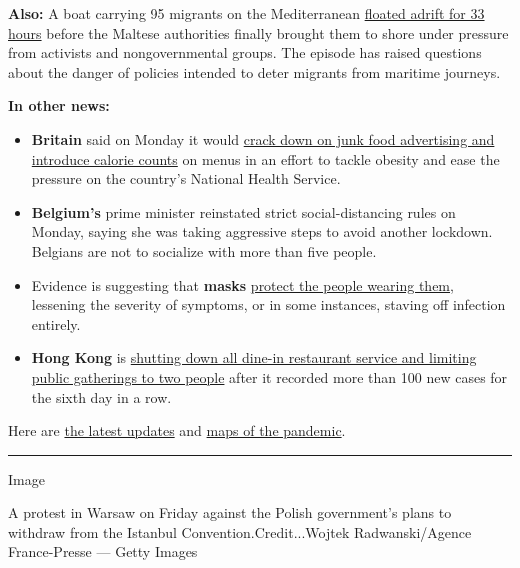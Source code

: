 \textbf{Also:} A boat carrying 95 migrants on the Mediterranean
\href{https://www.nytimes.com/2020/07/27/world/europe/migrant-boat-malta-stranded.html}{floated
adrift for 33 hours} before the Maltese authorities finally brought them
to shore under pressure from activists and nongovernmental groups. The
episode has raised questions about the danger of policies intended to
deter migrants from maritime journeys.

\textbf{In other news:}

\begin{itemize}
\item
  \textbf{Britain} said on Monday it would
  \href{https://www.nytimes.com/2020/07/27/world/europe/uk-boris-johnson-coronavirus-obesity.html}{crack
  down on junk food advertising and introduce calorie counts} on menus
  in an effort to tackle obesity and ease the pressure on the country's
  National Health Service.
\item
  \textbf{Belgium's} prime minister reinstated strict social-distancing
  rules on Monday, saying she was taking aggressive steps to avoid
  another lockdown. Belgians are not to socialize with more than five
  people.
\item
  Evidence is suggesting that \textbf{masks}
  \href{https://www.nytimes.com/2020/07/27/health/coronavirus-mask-protection.html}{protect
  the people wearing them}, lessening the severity of symptoms, or in
  some instances, staving off infection entirely.
\item
  \textbf{Hong Kong} is
  \href{https://www.nytimes.com/2020/07/27/world/coronavirus-covid-19.html?action=click\&pgtype=Article\&state=default\&module=styln-coronavirus-national\&region=TOP_BANNER\&context=storylines_menu\#link-4947ccd3}{shutting
  down all dine-in restaurant service and limiting public gatherings to
  two people} after it recorded more than 100 new cases for the sixth
  day in a row.
\end{itemize}

Here are
\href{https://www.nytimes.com/2020/07/27/world/coronavirus-covid-19.html}{the
latest updates} and
\href{https://www.nytimes.com/interactive/2020/world/coronavirus-maps.html}{maps
of the pandemic}.

\begin{center}\rule{0.5\linewidth}{\linethickness}\end{center}

Image

A protest in Warsaw on Friday against the Polish government's plans to
withdraw from the Istanbul Convention.Credit...Wojtek Radwanski/Agence
France-Presse --- Getty Images

